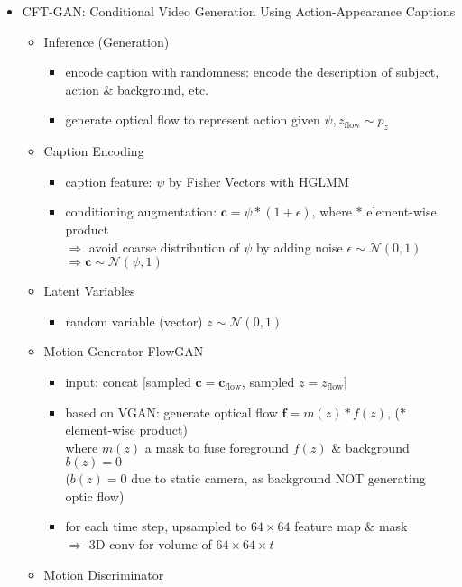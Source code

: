 \begin{itemize}
\item CFT-GAN: Conditional Video Generation Using Action-Appearance Captions
	\begin{itemize}
	\item Inference (Generation)
		\begin{itemize}
		\item encode caption with randomness: encode the description of subject, action \& background, etc.
		\item generate optical flow to represent action given $\psi, z_\text{flow}\sim p_z$
		\end{itemize}
	\item Caption Encoding
		\begin{itemize}
		\item caption feature: $\psi$ by Fisher Vectors with HGLMM
		\item conditioning augmentation: $\mathbf c = \psi*(1+\epsilon)$, where $*$ element-wise product \\
		$\Rightarrow$ avoid coarse distribution of $\psi$ by adding noise $\epsilon\sim\mathcal N(0,1)$ \\
		$\Rightarrow \mathbf c \sim \mathcal N(\psi, 1)$
		\end{itemize}
	\item Latent Variables
		\begin{itemize}
		\item random variable (vector) $z\sim\mathcal N(0,1)$
		\end{itemize}
	\item Motion Generator FlowGAN
		\begin{itemize}
		\item input: concat [sampled $\mathbf c=\mathbf c_\text{flow}$, sampled $z=z_\text{flow}$]
		\item based on VGAN: generate optical flow $\mathbf f = m(z)*f(z)$, ($*$ element-wise product)\\ 
		where $m(z)$ a mask to fuse foreground $f(z)$ \& background $b(z)=0$ \\
		($b(z)=0$ due to static camera, as background NOT generating optic flow)
		\item for each time step, upsampled to $64\times 64$ feature map \& mask \\
		$\Rightarrow$ 3D conv for volume of $64\times64\times t$
		\end{itemize}
	\item Motion Discriminator
		\begin{itemize}

\end{itemize}
\end{itemize}
\end{itemize}
